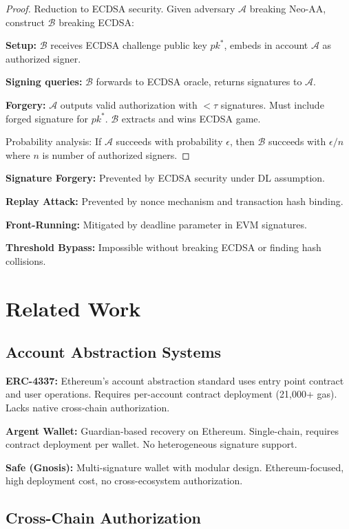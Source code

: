 \documentclass[10pt,twocolumn]{article}
\begin{document}
{\begin{proof}
Reduction to ECDSA security. Given adversary $\mathcal{A}$ breaking Neo-AA, construct $\mathcal{B}$ breaking ECDSA:

\textbf{Setup:} $\mathcal{B}$ receives ECDSA challenge public key $pk^*$, embeds in account $\mathcal{A}$ as authorized signer.

\textbf{Signing queries:} $\mathcal{B}$ forwards to ECDSA oracle, returns signatures to $\mathcal{A}$.

\textbf{Forgery:} $\mathcal{A}$ outputs valid authorization with $< \tau$ signatures. Must include forged signature for $pk^*$. $\mathcal{B}$ extracts and wins ECDSA game.

Probability analysis: If $\mathcal{A}$ succeeds with probability $\epsilon$, then $\mathcal{B}$ succeeds with $\epsilon/n$ where $n$ is number of authorized signers.
\end{proof}


\textbf{Signature Forgery:} Prevented by ECDSA security under DL assumption.

\textbf{Replay Attack:} Prevented by nonce mechanism and transaction hash binding.

\textbf{Front-Running:} Mitigated by deadline parameter in EVM signatures.

\textbf{Threshold Bypass:} Impossible without breaking ECDSA or finding hash collisions.


\section{Related Work}

\subsection{Account Abstraction Systems}

\textbf{ERC-4337:} Ethereum's account abstraction standard uses entry point contract and user operations. Requires per-account contract deployment (21,000+ gas). Lacks native cross-chain authorization.

\textbf{Argent Wallet:} Guardian-based recovery on Ethereum. Single-chain, requires contract deployment per wallet. No heterogeneous signature support.

\textbf{Safe (Gnosis):} Multi-signature wallet with modular design. Ethereum-focused, high deployment cost, no cross-ecosystem authorization.

\subsection{Cross-Chain Authorization}

}
\end{document}
